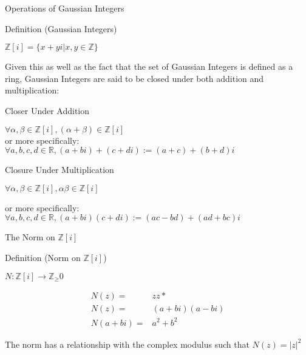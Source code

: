 \begin{frame}{Operations of Gaussian Integers}
    \begin{block}{Definition (Gaussian Integers)}
    \begin{center}
        $\mathbb{Z}[i] = \{x + yi|x, y \in  \mathbb{Z}\}$
    \end{center}
    \end{block}
    
Given this as well as the fact that the set of Gaussian Integers is defined as a ring, Gaussian Integers are said to be closed under both addition and multiplication:
    
\begin{block}{Closer Under Addition}
\begin{center}
    $\forall \alpha, \beta \in \mathbb{Z}[i], (\alpha + \beta) \in \mathbb{Z}[i]$\\
    
    or more specifically:\\
    
    $\forall a, b, c, d \in \mathbb{R}, (a + bi) + (c + di) := (a + c) + (b + d)i$
\end{center}

\end{block}

\begin{block}{Closure Under Multiplication}
\begin{center}
    $\forall \alpha, \beta \in \mathbb{Z}[i], \alpha \beta \in \mathbb{Z}[i]$
    
    or more specifically:\\
    
    $\forall a, b, c, d \in \mathbb{R}, (a + bi)(c + di) := (ac - bd) + (ad + bc)i$\\
\end{center}
\end{block}


\end{frame}

\begin{frame}{The Norm on $\mathbb{Z}[i]$}
    \begin{block}{Definition (Norm on $\mathbb{Z}[i]$)}
        \begin{center}
            $N: \mathbb{Z}[i] \rightarrow \mathbb{Z}_\geq 0$
        \end{center}
        \begin{align*}
            N(z) =& zz*\\
            N(z) =& (a + bi)(a - bi)\\
            N(a + bi) =& a^2 + b^2
        \end{align*}
    \end{block}


The norm has a relationship with the complex modulus such that $N(z) = |z|^2$
\end{frame}


